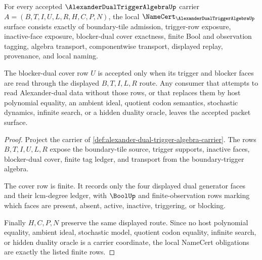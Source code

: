 \begin{theorem}
\label{thm:alexander-dual-trigger-algebra-namecert-obligations}
For every accepted $\AlexanderDualTriggerAlgebraUp$ carrier $A=(B,T,I,U,L,R,H,C,P,N)$, the local $\NameCert_{\AlexanderDualTriggerAlgebraUp}$ surface consists exactly of boundary-tile admission, trigger-row exposure, inactive-face exposure, blocker-dual cover exactness, finite Bool and observation tagging, algebra transport, componentwise transport, displayed replay, provenance, and local naming.

The blocker-dual cover row $U$ is accepted only when its trigger and blocker faces are read through the displayed $B,T,I,L,R$ route. Any consumer that attempts to read Alexander-dual data without those rows, or that replaces them by host polynomial equality, an ambient ideal, quotient codon semantics, stochastic dynamics, infinite search, or a hidden duality oracle, leaves the accepted packet surface.
\end{theorem}
\begin{proof}
Project the carrier of \autoref{def:alexander-dual-trigger-algebra-carrier}. The rows $B,T,I,U,L,R$ expose the boundary-tile source, trigger supports, inactive faces, blocker-dual cover, finite tag ledger, and transport from the boundary-trigger algebra.

The cover row is finite. It records only the four displayed dual generator faces and their lcm-degree ledger, with $\BoolUp$ and finite-observation rows marking which faces are present, absent, active, inactive, triggering, or blocking.

Finally $H,C,P,N$ preserve the same displayed route. Since no host polynomial equality, ambient ideal, stochastic model, quotient codon equality, infinite search, or hidden duality oracle is a carrier coordinate, the local NameCert obligations are exactly the listed finite rows.
\end{proof}

